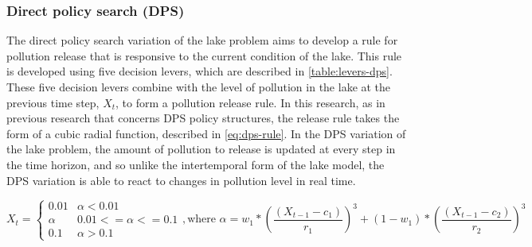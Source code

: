         \subsubsection{Direct policy search (DPS)}
        The direct policy search variation of the lake problem aims to develop a rule for pollution release that is responsive to the current condition of the lake. This rule is developed using five decision levers, which are described in \cref{table:levers-dps}. These five decision levers combine with the level of pollution in the lake at the previous time step, $X_{t}$, to form a pollution release rule. In this research, as in previous research that concerns DPS policy structures, the release rule takes the form of a cubic radial function, described in \cref{eq:dps-rule}. In the DPS variation of the lake problem, the amount of pollution to release is updated at every step in the time horizon, and so unlike the intertemporal form of the lake model, the DPS variation is able to react to changes in pollution level in real time.

        \begin{equation}\label{eq:dps-rule}
        X_{t} = \begin{cases}
                    0.01 & \alpha < 0.01 \\
                    \alpha & 0.01 <= \alpha <= 0.1 \\
                    0.1 & \alpha > 0.1
                \end{cases}, 
                \text{where } \alpha = w_{1}*(\frac{(X_{t-1}-c_{1})}{r_{1}})^{3} + (1-w_{1})*(\frac{(X_{t-1}-c_{2})}{r_{2}})^{3}
        \end{equation}

